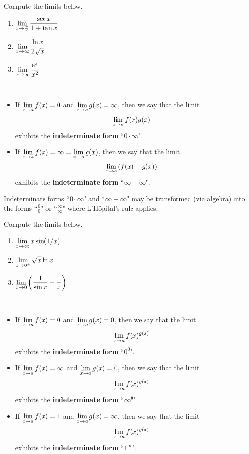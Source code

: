 \newpage 

\begin{example}
Compute the limits below.
\begin{enumerate}
\item $\displaystyle\lim_{x\to \frac{\pi}{2}}\frac{\sec x}{1+\tan x}$
\vfill
\item $\displaystyle\lim_{x\to \infty}\frac{\ln x}{2\sqrt x}$
\vfill
\item $\displaystyle\lim_{x\to \infty}\frac{\mathrm{e}^x}{x^2}$
\vfill
\end{enumerate}
\end{example}

\newpage

\begin{definition}\,
\begin{itemize}
\item If $\displaystyle\lim_{x\to a}f(x) = 0$ and $\displaystyle\lim_{x\to a}g(x) = \infty$, then we say that the limit $$\displaystyle\lim_{x\to a}f(x)g(x)$$ exhibits the \textbf{indeterminate form} ``$0\cdot\infty$".
\item If $\displaystyle\lim_{x\to a}f(x) = \infty = \lim_{x\to a}g(x)$, then we say that the limit $$\displaystyle\lim_{x\to a}\left(f(x)-g(x)\right)$$ exhibits the \textbf{indeterminate form} ``$\infty - \infty$".
\end{itemize}
\end{definition}

\begin{remark}
Indeterminate forms ``$0\cdot\infty$" and ``$\infty - \infty$" may be transformed (via algebra) into the forms ``$\frac{0}{0}$" or ``$\frac{\infty}{\infty}$" where L'H\^opital's rule applies.
\end{remark}

\begin{example}
Compute the limits below.
\begin{enumerate}
\item $\displaystyle\lim_{x\to\infty}x\sin(1/x)$
\vfill
\item $\displaystyle\lim_{x\to 0^+}\sqrt x\ln x$
\vfill
\item $\displaystyle\lim_{x\to 0}\left(\frac{1}{\sin x} - \frac{1}{x}\right)$
\vfill
\end{enumerate}
\end{example}

\newpage

\begin{definition}\,
\begin{itemize}
\item If $\displaystyle\lim_{x\to a}f(x) = 0$ and $\displaystyle\lim_{x\to a}g(x) = 0$, then we say that the limit $$\displaystyle\lim_{x\to a}f(x)^{g(x)}$$ exhibits the \textbf{indeterminate form} ``$0^0$".
\item If $\displaystyle\lim_{x\to a}f(x) = \infty$ and $\displaystyle\lim_{x\to a}g(x) = 0$, then we say that the limit $$\displaystyle\lim_{x\to a}f(x)^{g(x)}$$ exhibits the \textbf{indeterminate form} ``$\infty^0$".
\item If $\displaystyle\lim_{x\to a}f(x) = 1$ and $\displaystyle\lim_{x\to a}g(x) = \infty$, then we say that the limit $$\displaystyle\lim_{x\to a}f(x)^{g(x)}$$ exhibits the \textbf{indeterminate form} ``$1^{\infty}$".
\end{itemize}
\end{definition}

